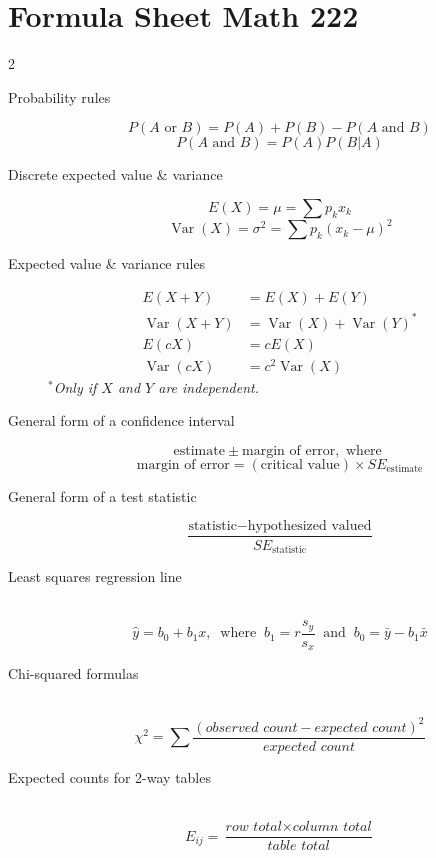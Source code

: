 \documentclass[10pt]{exam}
\newcommand{\ds}{\displaystyle}
\newcommand{\Var}{\operatorname{Var}}
\begin{document}
\graphicspath{{../../Semesters12-19/Spring18/Math222/}}

\section*{Formula Sheet \hfill Math 222}

\begin{multicols}{2}
\begin{description}
\item[Probability rules]
$$P(A \text{ or } B) = P(A) + P(B) - P(A \text{ and } B)$$
$$P(A \text{ and } B) = P(A) P(B|A)$$



\item[Discrete expected value \& variance]
$$E(X) = \mu = \sum p_k x_k$$
$$\Var(X) = \sigma^2 = \sum p_k (x_k - \mu)^2$$

\item[Expected value \& variance rules]

\begin{align*}
E(X+Y) &= E(X)+E(Y) \\
\Var(X+Y) &= \Var(X)+\Var(Y)^* \\ 
E(cX) &= cE(X) \\
\Var(cX) &= c^2 \Var(X) 
\end{align*}
$^*$\textit{Only if $X$ and $Y$ are independent.}


\item[General form of a confidence interval] 
$$\text{estimate} \pm \text{margin of error}, \text{ where }$$
$$\text{margin of error} = (\text{critical value}) \times SE_{\text{estimate}}$$

\item[General form of a test statistic]
$$ \frac{\text{statistic} - \text{hypothesized valued}}{SE_{\text{statistic}}}$$

\item[Least squares regression line] ~
$$\hat{y} = b_0+b_1 x, ~\text{  where  }~ b_1 = r \frac{s_y}{s_x} ~\text{  and  }~ b_0 = \bar{y} - b_1 \bar{x}$$


\item[Chi-squared formulas] ~
$$\ds \chi^2 = \sum \frac{(\textit{observed count}-\textit{expected count})^2}{\textit{expected count}}$$ 

\item[Expected counts for 2-way tables] ~ 
$$E_{ij} = \frac{\textit{row total} \times \textit{column total}}{\textit{table total}}$$ 
\end{description}
\end{multicols}
\end{document}
